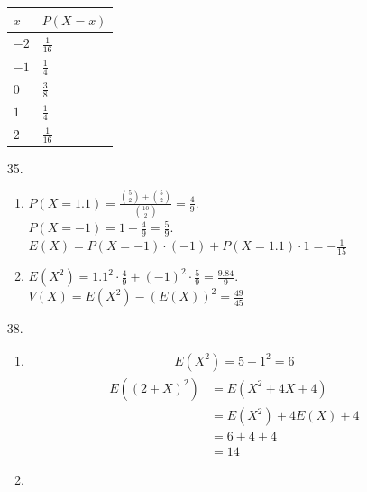 \documentclass{article}
\begin{document}
\begin{itemize}
\begin{tabular}{l|l}
\(x\) & \(P(X=x)\)\\
\hline
\(-2\) & \(\frac{1}{16}\)\\
\(-1\) & \(\frac{1}{4}\)\\
\(0\) & \(\frac{3}{8}\)\\
\(1\) & \(\frac{1}{4}\)\\
\(2\) & \(\frac{1}{16}\)\\
\end{tabular}

\item [35.]
  \begin{enumerate}[label=(\alph*)]
  \item
    $P(X=1.1) = \frac{{5 \choose 2} + {5 \choose 2}}{{10 \choose 2}} = \frac{4}{9}$.\\
    $P(X=-1)=1-\frac{4}{9}=\frac{5}{9}$.\\
    $E(X)=P(X=-1)\cdot (-1) + P(X=1.1)\cdot 1 = -\frac{1}{15}$
  \item $E(X^2) = 1.1^2 \cdot \frac{4}{9} + (-1)^2\cdot \frac{5}{9} = \frac{9.84}{9}$.\\
    $V(X) = E(X^2) - (E(X))^2 = \frac{49}{45}$
  \end{enumerate}
\item [38.]
  \begin{enumerate}[label=(\alph*)]
  \item
    \begin{equation*}
      \begin{split}
        E(X^2) = 5+1^2 = 6
      \end{split}
    \end{equation*}
    \begin{equation*}
      \begin{split}
        E((2+X)^2)
        &= E(X^2 + 4X + 4) \\
        &= E(X^2) + 4E(X) + 4\\
        &= 6 + 4 + 4\\
        &= 14
      \end{split}
    \end{equation*}
  \item 

\end{enumerate}
\end{itemize}
\end{document}
